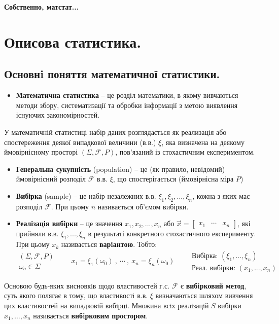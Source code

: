 \def\red#1{\textbf{\color{javared}#1}}
\def\blue#1{\textbf{\color{javadocblue}#1}}
\def\card{\text{card}}

\begin{center}
	\Huge \textbf{Собственно, матстат...}
\end{center}
\section{Описова статистика.}
\subsection{Основнi поняття математичної статистики.}
 \begin{itemize}
 \item\textbf{\color{javared} Математична статистика} -- це розділ математики, в якому вивчаються методи збору, систематизації та обробки інформації з метою виявлення існуючих закономірностей.
   \end{itemize}
     У математичній статистиці набір даних розглядається як реализація або спостереження деякої випадкової величини (в.в.) $\xi$, яка визначена на деякому ймовірнісному просторі $\left( \Sigma, \mathcal{F}, P \right)$, пов'язаний із стохастичним експериментом.
   \begin{itemize}
     \item \textbf{\color{javared} Генеральна сукупність} (population) --  це (як правило, невідомий) ймовірнісний розподіл $\mathcal{F}$ в.в. $\xi$, що спостерігається (ймовірнісна міра $P$)
     \item \textbf{\color{javared} Вибірка} (sample) -- це набір незалежних в.в. $\xi_1, \xi_2 ,..., \xi_n$, кожна з яких має розподіл $\mathcal{F}$. При цьому $n$ називається об'ємом вибірки.
     \item \textbf{\color{javared} Реалізація вибірки} -- це значення $x_1 , x_2 , ... , x_n$ або $\overrightarrow{x} = \begin{bmatrix}
      x_1 & \cdots & x_n
     \end{bmatrix}$, які прийняли в.в. $\xi_1 , ... , \xi_n$ в результаті конкретного стохастичного експерименту. При цьому $x_k$ називається \textbf{\color{javadocblue} варiантою}. Тобто:
     $$
     \begin{gathered}
      \left( \Sigma , \mathcal{F}, P \right)\\
      \omega_o \in \Sigma
     \end{gathered} \qquad x_1 = \xi_1(\omega_0)\ , \ \cdots \ , \  x_n  = \xi_n (\omega_0) \qquad \begin{array}{r}
      \text{Вибірка: } (\xi_1 , ..., \xi_n) \\
      \text{Реал. вибірки: } (x_1 , ... , x_n)
     \end{array}
     $$
 \end{itemize}
Основою будь-яких висновкiв щодо властивостей г.с. $\mathcal{F}$ є \textbf{\color{javadocblue} вибiрковий метод}, суть якого полягає в тому, що властивостi в.в. $\xi$
визначаються шляхом вивчення цих властивостей
на випадковiй вибiрцi. Множина всiх реалiзацiй $S$ вибiрки $x_1 , \dots , x_n$ називається \textbf{\color{javadocblue} вибiрковим простором}.

